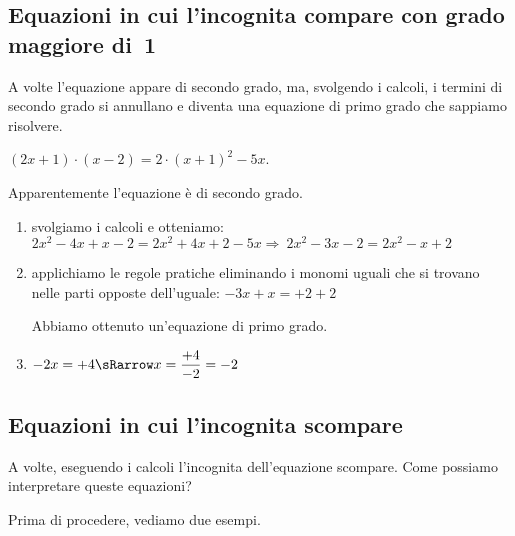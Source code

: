 
\subsection{Equazioni in cui l'incognita compare con grado maggiore di~1}
A volte l'equazione appare di secondo grado, ma, svolgendo i calcoli, 
i termini di secondo grado si annullano e diventa una equazione di primo 
grado che sappiamo risolvere.

\begin{esempio}{}{}

\((2x+1)\cdot (x-2)=2\cdot (x+1)^{2}-5x\).

\vspace{.5em}
Apparentemente l'equazione è di secondo grado. 

\begin{enumerate}
\item svolgiamo i calcoli e otteniamo:\\[1mm]
\(2x^{2}-4x+x-2=2x^{2}+4x+2-5x\Rightarrow~2x^{2}-3x-2=2x^{2}-x+2\)
\item applichiamo le regole pratiche eliminando i monomi
uguali che si trovano nelle parti opposte dell'uguale:
\(-3x+x=+2+2\)

Abbiamo ottenuto un'equazione di primo grado.
\item \(-2x = +4 \sRarrow x = \dfrac{+4}{-2} = -2\)
\end{enumerate}

\end{esempio}


\subsection{Equazioni in cui l'incognita scompare}
  

A volte, eseguendo i calcoli l'incognita dell'equazione scompare. 
Come possiamo interpretare queste equazioni?

Prima di procedere, vediamo due esempi.

